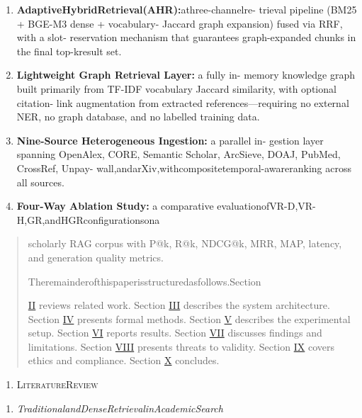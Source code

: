 \documentclass[
]{article}
\begin{document}
\begin{enumerate}
\def\labelenumi{\arabic{enumi})}
\item
  \textbf{AdaptiveHybridRetrieval(AHR):}athree-channelre- trieval pipeline (BM25 + BGE-M3 dense + vocabulary- Jaccard graph expansion) fused via RRF, with a slot- reservation mechanism that guarantees graph-expanded chunks in the final top-kresult set.
\item
  \textbf{Lightweight Graph Retrieval Layer:} a fully in- memory knowledge graph built primarily from TF-IDF vocabulary Jaccard similarity, with optional citation- link augmentation from extracted references---requiring no external NER, no graph database, and no labelled training data.
\item
  \textbf{Nine-Source Heterogeneous Ingestion:} a parallel in- gestion layer spanning OpenAlex, CORE, Semantic Scholar, ArcSieve, DOAJ, PubMed, CrossRef, Unpay- wall,andarXiv,withcompositetemporal-awareranking across all sources.
\item
  \textbf{Four-Way Ablation Study:} a comparative evaluationofVR-D,VR-H,GR,andHGRconfigurationsona
\end{enumerate}

\begin{quote}
scholarly RAG corpus with P@k, R@k, NDCG@k, MRR, MAP, latency, and generation quality metrics.

Theremainderofthispaperisstructuredasfollows.Section

\hyperref[Literature_Review]{II} reviews related work. Section \hyperref[System_Architecture]{III} describes the system architecture. Section \hyperref[Formal_Methods]{IV} presents formal methods. Section \hyperref[Experimental_Setup]{V} describes the experimental setup. Section \hyperref[Results]{VI} reports results. Section \hyperref[Discussion]{VII} discusses findings and limitations. Section \hyperref[Threats_to_Validity]{VIII} presents threats to validity. Section \hyperref[Ethicsux2c_Complianceux2c_and_Responsible_Use]{IX} covers ethics and compliance. Section \hyperref[Conclusion]{X} concludes.
\end{quote}

\begin{enumerate}
\def\labelenumi{\Roman{enumi}.}
\setcounter{enumi}{1}
\item
  \protect{}\label{Literature_Review}{}\textsc{LiteratureReview}
\end{enumerate}

\begin{enumerate}
\def\labelenumi{\Alph{enumi}.}
\item
  \emph{TraditionalandDenseRetrievalinAcademicSearch}
\end{enumerate}
\end{document}
